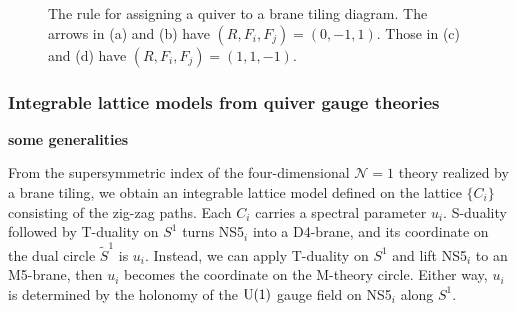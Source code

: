 \begin{figure}
{
    }
  \qquad
  \caption{The rule for assigning a quiver to a brane tiling diagram.
  The arrows in (a) and (b) have $(R, F_i, F_j)=(0, -1, 1)$. Those in
  (c) and (d) have $(R, F_i, F_j)=(1, 1, -1)$.}
  \label{fig:rule_for_quiver}
\end{figure}





\subsubsection{Integrable lattice models from quiver gauge theories}

{\bf some generalities}

From the supersymmetric index of the four-dimensional $\mathcal{N}=1$
theory realized by a brane tiling, we obtain an integrable lattice
model defined on the lattice $\{ C_{i}\} $ consisting
of the zig-zag paths. Each $C_{i}$ carries a spectral parameter $u_{i}$.
S-duality followed by T-duality on $S^{1}$ turns NS5$_{i}$ into
a D4-brane, and its coordinate on the dual circle $\tilde{S}^{1}$
is $u_{i}$. Instead, we can apply T-duality on $S^{1}$ and lift
NS5$_{i}$ to an M5-brane, then $u_{i}$ becomes the coordinate on the
M-theory circle. Either way, $u_{i}$ is determined by the holonomy
of the $\mathrm{U}(1)$ gauge field on NS5$_{i}$ along $S^{1}$.

